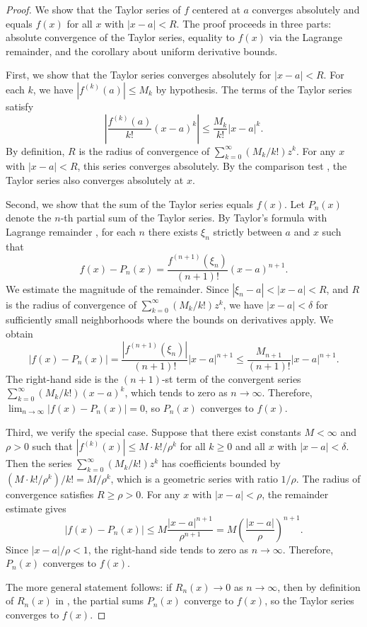 \begin{proof}
We show that the Taylor series of $f$ centered at $a$ converges absolutely and equals $f(x)$ for all $x$ with $|x - a| < R$. The proof proceeds in three parts: absolute convergence of the Taylor series, equality to $f(x)$ via the Lagrange remainder, and the corollary about uniform derivative bounds.

First, we show that the Taylor series converges absolutely for $|x - a| < R$. For each $k$, we have $|f^{(k)}(a)| \leq M_k$ by hypothesis. The terms of the Taylor series satisfy
$$\left|\frac{f^{(k)}(a)}{k!}(x - a)^k\right| \leq \frac{M_k}{k!}|x - a|^k.$$
By definition, $R$ is the radius of convergence of $\sum_{k=0}^\infty (M_k / k!) z^k$. For any $x$ with $|x - a| < R$, this series converges absolutely. By the comparison test , the Taylor series also converges absolutely at $x$.

Second, we show that the sum of the Taylor series equals $f(x)$. Let $P_n(x)$ denote the $n$-th partial sum of the Taylor series. By Taylor's formula with Lagrange remainder , for each $n$ there exists $\xi_n$ strictly between $a$ and $x$ such that
$$f(x) - P_n(x) = \frac{f^{(n+1)}(\xi_n)}{(n+1)!}(x - a)^{n+1}.$$
We estimate the magnitude of the remainder. Since $|\xi_n - a| < |x - a| < R$, and $R$ is the radius of convergence of $\sum_{k=0}^\infty (M_k / k!) z^k$, we have $|x - a| < \delta$ for sufficiently small neighborhoods where the bounds on derivatives apply. We obtain
$$|f(x) - P_n(x)| = \frac{|f^{(n+1)}(\xi_n)|}{(n+1)!}|x - a|^{n+1} \leq \frac{M_{n+1}}{(n+1)!}|x - a|^{n+1}.$$
The right-hand side is the $(n+1)$-st term of the convergent series $\sum_{k=0}^\infty (M_k / k!)(x - a)^k$, which tends to zero as $n \to \infty$. Therefore, $\lim_{n \to \infty} |f(x) - P_n(x)| = 0$, so $P_n(x)$ converges to $f(x)$.

Third, we verify the special case. Suppose that there exist constants $M < \infty$ and $\rho > 0$ such that $|f^{(k)}(x)| \leq M \cdot k! / \rho^k$ for all $k \geq 0$ and all $x$ with $|x - a| < \delta$. Then the series $\sum_{k=0}^\infty (M_k / k!) z^k$ has coefficients bounded by $(M \cdot k! / \rho^k) / k! = M / \rho^k$, which is a geometric series with ratio $1/\rho$. The radius of convergence satisfies $R \geq \rho > 0$. For any $x$ with $|x - a| < \rho$, the remainder estimate gives
$$|f(x) - P_n(x)| \leq M \frac{|x - a|^{n+1}}{\rho^{n+1}} = M \left(\frac{|x - a|}{\rho}\right)^{n+1}.$$
Since $|x - a| / \rho < 1$, the right-hand side tends to zero as $n \to \infty$. Therefore, $P_n(x)$ converges to $f(x)$.

The more general statement follows: if $R_n(x) \to 0$ as $n \to \infty$, then by definition of $R_n(x)$ in , the partial sums $P_n(x)$ converge to $f(x)$, so the Taylor series converges to $f(x)$.
\end{proof}
